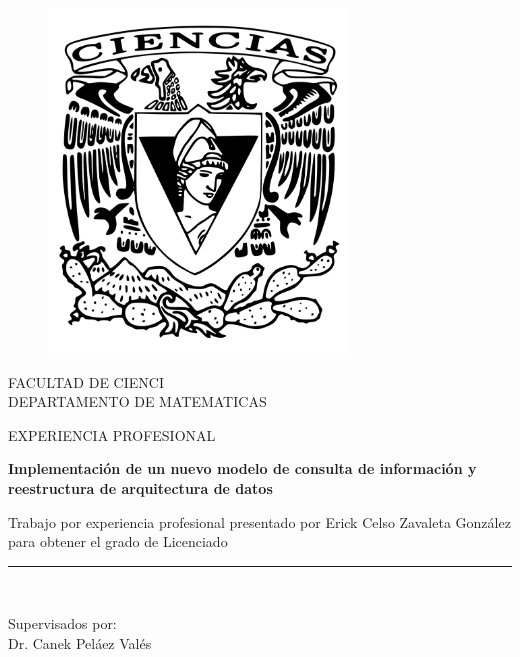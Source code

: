 \documentclass[a4paper,openright,12pt]{book}
\begin{document}
\begin{titlepage}

\begin{center}
\vspace*{-1in}
\begin{figure}[htb]
\begin{center}
\includegraphics[width=8cm]{ciencias2}
\end{center}
\end{figure}

FACULTAD DE CIENCI\\
\vspace*{0.15in}
DEPARTAMENTO DE MATEMATICAS\\
\vspace*{0.6in}
\begin{large}
EXPERIENCIA PROFESIONAL\\
\end{large}
\vspace*{0.2in}
\begin{Large}
\textbf{Implementaci\'on de un nuevo modelo de consulta de informaci\'on y reestructura de arquitectura de datos} \\
\end{Large}
\vspace*{0.3in}
\begin{large}
Trabajo por experiencia profesional presentado por Erick Celso Zavaleta Gonz\'alez para obtener el grado de Licenciado \\
\end{large}
\vspace*{0.3in}
\rule{80mm}{0.1mm}\\
\vspace*{0.1in}
\begin{large}
Supervisados por: \\
Dr. Canek Pel\'aez Val\'es \\
\end{large}
\end{center}

\end{titlepage}
\end{document}
